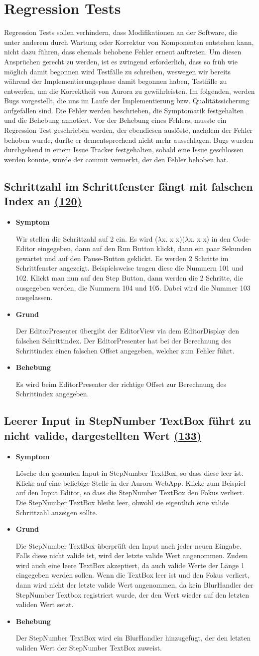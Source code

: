 \documentclass[parskip=full,11pt,twoside]{scrartcl}
\newcommand{\issueref}[1]{
    \href{https://git.scc.kit.edu/ap/Aurora/issues/#1}{(#1)}
}
\newcommand{\regrtest}[5]{
    \subsection{#1 \issueref{#2}}
    \begin{itemize}
        \item \textbf{Symptom}
            #3
        \item \textbf{Grund}
            #4
        \item \textbf{Behebung}
            #5
    \end{itemize}
}
\begin{document}
\section{Regression Tests}
Regression Tests sollen verhindern, dass Modifikationen an der Software, die unter anderem durch Wartung oder Korrektur von Komponenten entstehen kann, nicht dazu führen,
dass ehemals behobene Fehler erneut auftreten.
Um diesen Ansprüchen gerecht zu werden, ist es zwingend erforderlich, dass so früh wie möglich damit begonnen wird Testfälle zu schreiben,
weswegen wir bereits während der Implementierungsphase damit begonnen haben, Testfälle zu entwerfen, um die Korrektheit von Aurora zu gewährleisten.
Im folgenden, werden Bugs vorgestellt, die uns im Laufe der Implementierung bzw. Qualitätssicherung aufgefallen sind.
Die Fehler werden beschrieben, die Symptomatik festgehalten und die Behebung annotiert.
Vor der Behebung eines Fehlers, musste ein Regression Test geschrieben werden, der ebendiesen auslöste, nachdem der Fehler behoben wurde, durfte er dementsprechend nicht mehr ausschlagen.
Bugs wurden durchgehend in einem Issue Tracker festgehalten, sobald eine Issue geschlossen werden konnte, wurde der commit vermerkt, der den Fehler behoben hat.


\regrtest{Schrittzahl im Schrittfenster fängt mit falschen Index an}{120}{
	Wir stellen die Schrittzahl auf 2 ein.
	Es wird ($\lambda$x. x x)($\lambda$x. x x) in den Code-Editor eingegeben,
	dann auf den Run Button klickt, dann ein paar Sekunden gewartet und auf den Pause-Button geklickt.
	Es werden 2 Schritte im Schrittfenster angezeigt.
	Beispielsweise tragen diese die Nummern 101 und 102.
	Klickt man nun auf den Step Button, dann werden die 2 Schritte, die ausgegeben werden, die Nummern 104 und 105.
	Dabei wird die Nummer 103 ausgelassen.
}{
Der EditorPresenter übergibt der EditorView via dem EditorDisplay den falschen Schrittindex.
Der EditorPresenter hat bei der Berechnung des Schrittindex einen falschen Offset angegeben, welcher zum Fehler führt.
}{
Es wird beim EditorPresenter der richtige Offset zur Berechnung des Schrittindex angegeben.
}

\regrtest{Leerer Input in StepNumber TextBox führt zu nicht valide, dargestellten Wert}{133}{
	Lösche den gesamten Input in StepNumber TextBox, so dass diese leer ist. Klicke auf eine beliebige Stelle in der Aurora WebApp.
	Klicke zum Beispiel auf den Input Editor, so dass die StepNumber TextBox den Fokus verliert.
	Die StepNumber TextBox bleibt leer, obwohl sie eigentlich eine valide Schrittzahl anzeigen sollte.
}{
Die StepNumber TextBox überprüft den Input nach jeder neuen Eingabe.
Falls diese nicht valide ist, wird der letzte valide Wert angenommen.
Zudem wird auch eine leere TextBox akzeptiert, da auch valide Werte der Länge 1 eingegeben werden sollen.
Wenn die TextBox leer ist und den Fokus verliert, dann wird nicht der letzte valide Wert angenommen, da kein BlurHandler der StepNumber Textbox registriert wurde,
der den Wert wieder auf den letzten validen Wert setzt.
}{
Der StepNumber TextBox wird ein BlurHandler hinzugefügt, der den letzten validen Wert der StepNumber TextBox zuweist.
}
\end{document}
